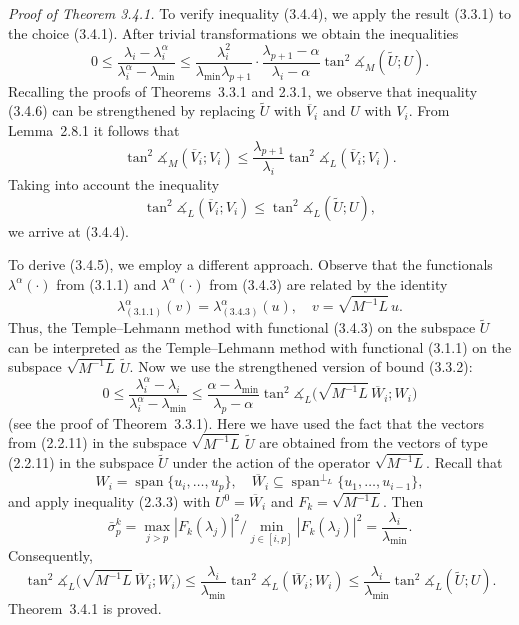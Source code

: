 \documentclass[11pt,oneside]{book}
\newcommand{\myspan}{\operatorname{span}}
\newcommand{\ang}{\measuredangle}
\begin{document}
\textit{Proof of Theorem 3.4.1.} To verify inequality (3.4.4), we apply the result (3.3.1) to the choice (3.4.1). After trivial transformations we obtain the inequalities
\[
0 \leqslant \frac{\lambda_i - \lambda_i^\alpha}{\lambda_i^\alpha - \lambda_{\min}} \leqslant \frac{\lambda_i^2}{\lambda_{\min}\lambda_{p+1}} \cdot \frac{\lambda_{p+1} - \alpha}{\lambda_i - \alpha} \tan^2 \ang_M(\widetilde{U}; U).
\tag{3.4.6}
\]
Recalling the proofs of Theorems~3.3.1 and 2.3.1, we observe that inequality (3.4.6) can be strengthened by replacing $\widetilde{U}$ with $\overline{V}_i$ and $U$ with $V_i$. From Lemma~2.8.1 it follows that
\[
\tan^2 \ang_M(\overline{V}_i; V_i) \leqslant \frac{\lambda_{p+1}}{\lambda_i} \tan^2 \ang_L(\overline{V}_i; V_i).
\]
Taking into account the inequality
\[
\tan^2 \ang_L(\overline{V}_i; V_i) \leqslant \tan^2 \ang_L(\widetilde{U}; U),
\]
we arrive at (3.4.4).

To derive (3.4.5), we employ a different approach. Observe that the functionals $\lambda^\alpha(\cdot)$ from (3.1.1) and $\lambda^\alpha(\cdot)$ from (3.4.3) are related by the identity
\[
\lambda_{(3.1.1)}^\alpha(v) = \lambda_{(3.4.3)}^\alpha(u), \quad v = \sqrt{M^{-1}L}\,u.
\]
Thus, the Temple--Lehmann method with functional (3.4.3) on the subspace $\widetilde{U}$ can be interpreted as the Temple--Lehmann method with functional (3.1.1) on the subspace $\sqrt{M^{-1}L}\,\widetilde{U}$. Now we use the strengthened version of bound (3.3.2):
\[
0 \leqslant \frac{\lambda_i^\alpha - \lambda_i}{\lambda_i^\alpha - \lambda_{\min}} \leqslant \frac{\alpha - \lambda_{\min}}{\lambda_p - \alpha} \tan^2 \ang_L\bigl(\sqrt{M^{-1}L}\,\overline{W}_i; W_i\bigr)
\]
(see the proof of Theorem~3.3.1). Here we have used the fact that the vectors from (2.2.11) in the subspace $\sqrt{M^{-1}L}\,\widetilde{U}$ are obtained from the vectors of type (2.2.11) in the subspace $\widetilde{U}$ under the action of the operator $\sqrt{M^{-1}L}$. Recall that
\[
W_i = \myspan\{u_i, \ldots, u_p\}, \quad \overline{W}_i \subseteq \myspan^{\perp_L}\{u_1, \ldots, u_{i-1}\},
\]
and apply inequality (2.3.3) with $U^0 = \overline{W}_i$ and $F_k = \sqrt{M^{-1}L}$. Then
\[
\bar{\sigma}_p^k = \max_{j > p} |F_k(\lambda_j)|^2 \Big/ \min_{j \in [i, p]} |F_k(\lambda_j)|^2 = \frac{\lambda_i}{\lambda_{\min}}.
\]
Consequently,
\[
\tan^2 \ang_L\bigl(\sqrt{M^{-1}L}\,\overline{W}_i; W_i\bigr) \leqslant \frac{\lambda_i}{\lambda_{\min}} \tan^2 \ang_L(\overline{W}_i; W_i) \leqslant \frac{\lambda_i}{\lambda_{\min}} \tan^2 \ang_L(\widetilde{U}; U).
\]
Theorem~3.4.1 is proved.
\end{document}
